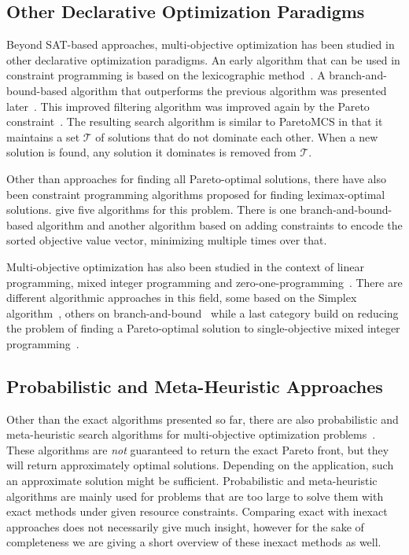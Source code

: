 \subsection{Other Declarative Optimization Paradigms\label{sec:other-approaches}}

Beyond SAT-based approaches, multi-objective optimization has been studied in other declarative optimization paradigms.
An early algorithm that can be used in constraint programming is based on the lexicographic method~\autocite{Wassenhove1980}.
A branch-and-bound-based algorithm that outperforms the previous algorithm was presented later~\autocite{DBLP:conf/ecai/Gavanelli02}.
This improved filtering algorithm was improved again by the Pareto constraint~\autocite{DBLP:conf/cp/SchausH13,DBLP:conf/aaai/HartertS14}.
The resulting search algorithm is similar to ParetoMCS in that it maintains a set $\mathcal{T}$ of solutions that do not dominate each other.
When a new solution is found, any solution it dominates is removed from $\mathcal{T}$.

Other than approaches for finding all Pareto-optimal solutions, there have also been constraint programming algorithms proposed for finding leximax-optimal solutions.
\Textcite{DBLP:journals/ai/BouveretL09} give five algorithms for this problem.
There is one branch-and-bound-based algorithm and another algorithm based on adding constraints to encode the sorted objective value vector, minimizing multiple times over that.

Multi-objective optimization has also been studied in the context of linear programming, mixed integer programming and zero-one-programming~\autocites{Ehrgott2005-6,Rasmussen1986,DBLP:journals/eor/AlvesC07}.
There are different algorithmic approaches in this field, some based on the Simplex algorithm~\autocites{Ehrgott2005-7,DBLP:journals/mp/EvansS73}, others on branch-and-bound~\autocites{Adelgren2021,DBLP:journals/siamjo/SantisENR20} while a last category build on reducing the problem of finding a Pareto-optimal solution to single-objective mixed integer programming~\autocites{DBLP:journals/jota/Sun17,DBLP:journals/ol/LuMS20,Soland1979}.

\subsection{Probabilistic and Meta-Heuristic Approaches\label{sec:approximative}}

Other than the exact algorithms presented so far, there are also probabilistic and meta-heuristic search algorithms for multi-objective optimization problems~\autocite{Saini2021}.
These algorithms are \emph{not} guaranteed to return the exact Pareto front, but they will return approximately optimal solutions.
Depending on the application, such an approximate solution might be sufficient.
Probabilistic and meta-heuristic algorithms are mainly used for problems that are too large to solve them with exact methods under given resource constraints.
Comparing exact with inexact approaches does not necessarily give much insight, however for the sake of completeness we are giving a short overview of these inexact methods as well.

